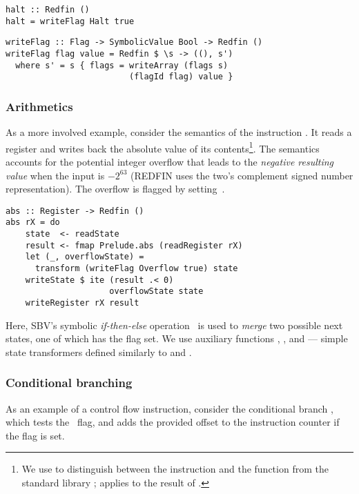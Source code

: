 \begin{verbatim}
halt :: Redfin ()
halt = writeFlag Halt true
\end{verbatim}

\begin{verbatim}
writeFlag :: Flag -> SymbolicValue Bool -> Redfin ()
writeFlag flag value = Redfin $ \s -> ((), s')
  where s' = s { flags = writeArray (flags s)
                         (flagId flag) value }
\end{verbatim}



\subsubsection{Arithmetics}
As a more involved example, consider the semantics of the instruction .
It reads a register and writes back the absolute value of its
contents\footnote{We use  to distinguish between the instruction
and the function from the standard library ;  applies
 to the result of .}.
The semantics accounts for the potential integer overflow that leads to the
\emph{negative resulting value} when the input is $-2^{63}$ (REDFIN
uses the two's complement signed number representation). The overflow is flagged
by setting~.


\begin{verbatim}
abs :: Register -> Redfin ()
abs rX = do
    state  <- readState
    result <- fmap Prelude.abs (readRegister rX)
    let (_, overflowState) =
      transform (writeFlag Overflow true) state
    writeState $ ite (result .< 0)
                     overflowState state
    writeRegister rX result
\end{verbatim}


\noindent
Here, SBV's symbolic \emph{if-then-else} operation~ is used to \emph{merge}
two possible next states, one of which has the  flag set. We use
auxiliary functions , ,  and
 --- simple state transformers defined similarly to
 and .


\subsubsection{Conditional branching}
As an example of a control flow instruction, consider the conditional branch
, which tests the~ flag, and adds the
provided offset to the instruction counter if the flag is set.


